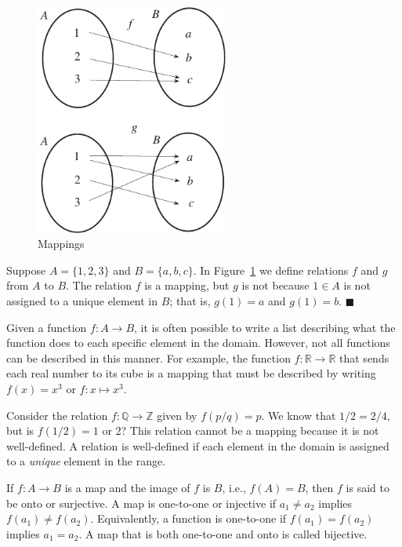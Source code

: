 \begin{figure}[htb]
\begin{center}
\centerline {
\includegraphics[width=2.5in]{sets_figure_1}
}
\end{center}
\caption{Mappings}
\label{sets_figure_1}
\end{figure}

Suppose $A = \{1, 2, 3 \}$ and $B = \{a, b, c \}$.  In Figure~\ref{sets_figure_1} we define relations $f$ and  $g$ from $A$ to $B$.  The relation $f$ is a mapping, but $g$ is not because $1 \in A$ is not assigned to a unique element in $B$; that is, $g(1) = a$ and $g(1) = b$.  
\hspace{\fill} $\blacksquare$

\medskip

Given a function $f : A \rightarrow B$, it is often possible to write a list describing what the function does to each specific element in the domain.  However, not all functions can be described in this manner.  For example, the function $f: {\mathbb R} \rightarrow {\mathbb R}$ that sends each real number to its cube is a mapping that must be described by writing $f(x) = x^3$ or $f:x \mapsto x^3$. 
 
Consider the relation $f : {\mathbb Q} \rightarrow {\mathbb Z}$ given by $f(p/q) = p$.  We know that $1/2 = 2/4$, but is $f(1/2) = 1$ or 2?  This relation cannot be a mapping because it is not well-defined.  A relation is {\bfi well-defined\/} if each element in the domain is assigned to a {\em unique\/} element in the range. 

If $f:A \rightarrow B$ is a map and the image of $f$ is $B$, i.e., $f(A) = B$, then $f$ is said to be {\bfi onto\/} or {\bfi surjective}.  A map is {\bfi one-to-one\/} or {\bfi injective\/} if $a_1 \neq a_2$ implies $f(a_1) \neq f(a_2)$.  Equivalently, a function is one-to-one if $f(a_1) = f(a_2)$ implies $a_1 = a_2$.  A map that is both one-to-one and onto is called {\bfi bijective}.

